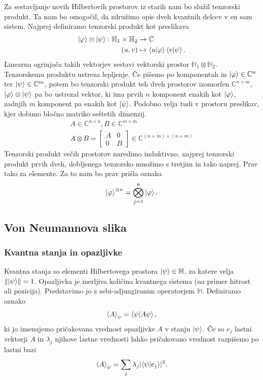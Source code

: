\documentclass[mat1]{fmfdelo}
\newcommand{\C}{\mathbb C}
\newcommand{\Hb}{\mathbb H}
\begin{document}
Za sestavljanje novih Hilbertovih prostorov iz starih nam bo služil tenzorski produkt. Ta nam bo omogočil, da združimo opis dveh kvantnih delcev v en sam sistem. Najprej definiramo tenzorski produkt kot preslikava
\begin{align*}
    \ket\varphi \otimes \ket\psi : \Hb_1 \times \Hb_2 &\to \mathbb C\\
    (u,v) &\mapsto \braket{u}{\varphi} \braket{v}{\psi}.
\end{align*}
Linearna ogrinjača takih vektorjev sestavi vektorski prostor \(\Hb_1 \otimes \Hb_2\). Tenzorskemu produktu ustreza lepljenje. Če pišemo po komponentah in \(\ket\varphi\in\C^n\) ter \(\ket\psi\in\C^m\), potem bo tenzorski produkt teh dveh prostorov izomorfen \(\C^{n+m}\), \(\ket\varphi\otimes\ket\psi\) pa bo ustrezal vektor, ki ima prvih \(n\) komponent enakih kot \(\ket\varphi\), zadnjih \(m\) komponent pa enakih kot \(\ket\psi\). Podobno velja tudi v prostoru preslikav, kjer dobimo bločno matriko seštetih dimenzij.
\begin{align*}
    A\in \C^{n\times n}, B\in\C^{m\times m}\\
    A\otimes B = \begin{bmatrix}
        A&0\\
        0&B
    \end{bmatrix}\in \C^{(n+m)\times (n+m)}
\end{align*}
Tenzorski produkt večih prostorov naredimo induktivno, najprej tenzorski produkt prvih dveh, dobljenega tenzorsko množimo s tretjim in tako naprej. Prav tako za elemente. Za to nam bo prav prišla oznaka
\begin{align*}
    \ket{\varphi}^{\otimes n} = \bigotimes_{j=1}^n \ket\varphi.
\end{align*}

\subsection{Von Neumannova slika}
\subsubsection{Kvantna stanja in opazljivke}
Kvantna stanja so elementi Hilbertovega prostora \(\ket\psi\in\Hb\), za katere velja \(\norm{\ket\psi} = 1\). Opazljivka je merljiva količina kvantnega sistema (na primer hitrost ali pozicija). Predstavimo jo z sebi-adjungiranim operatorjem \(\Hb\). Definiramo oznako
\begin{align*}
    \ev{A}_\psi = \braket{\psi}{A\psi},
\end{align*}
ki jo imenujemo pričakovana vrednost opazljivke \(A\) v stanju \(\ket\psi\). Če so \(e_j\) lastni vektorji \(A\) in \(\lambda_j\) njihove lastne vrednosti lahko pričakovano vrednost razpišemo po lastni bazi
\begin{align*}
    \ev{A}_\psi = \sum_j\lambda_j\lvert \braket{\psi}{e_j}\rvert^2.
\end{align*}
\end{document}

